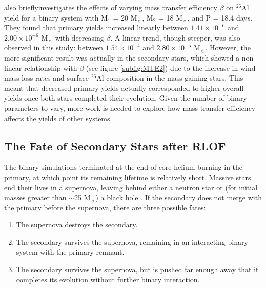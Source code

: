 \cite{2019ApJ...884...38B} also briefly\footnotemark investigates the effects of varying mass transfer efficiency $\beta$ on $^{26}$Al yield for a binary system with M$_1$ = 20 M$_{\sun}$, M$_2$ = 18 M$_{\sun}$, and P = 18.4 days. They found that primary yields increased linearly between $1.41\times10^{-6}$ and $2.00\times10^{-6}$ M$_{\sun}$ with decreasing $\beta$.
A linear trend, though steeper, was also observed in this study: between $1.54\times10^{-4}$ and $2.80\times10^{-5}$ M$_{\sun}$.
However, the more significant result was actually in the secondary stars, which showed a non-linear relationship with $\beta$ (see figure \ref{subfig:MTE2}) due to the increase in wind mass loss rates and surface $^{26}$Al composition in the mass-gaining stars.
This meant that decreased primary yields actually corresponded to higher overall yields once both stars completed their evolution.
Given the number of binary parameters to vary, more work is needed to explore how mass transfer efficiency affects the yields of other systems.

\subsection{The Fate of Secondary Stars after RLOF}

The binary simulations terminated at the end of core helium-burning in the primary, at which point its remaining lifetime is relatively short. Massive stars end their lives in a supernova, leaving behind either a neutron star or (for initial masses greater than $\sim$25 M$_{\sun}$) a black hole \citep[see][]{Carroll2007,Iliadis2015}.
If the secondary does not merge with the primary before the supernova, there are three possible fates:
\begin{enumerate}
    \item The supernova destroys the secondary.
    \item The secondary survives the supernova, remaining in an interacting binary system with the primary remnant.
    \item The secondary survives the supernova, but is pushed far enough away that it completes its evolution without further binary interaction.
\end{enumerate}

